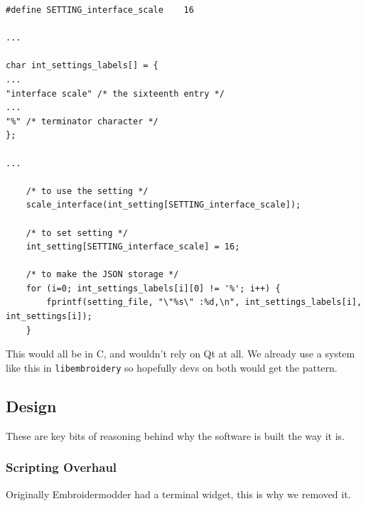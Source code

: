 \documentclass[a4paper, 11pt]{report}
\begin{document}
\begin{verbatim}
#define SETTING_interface_scale    16

...

char int_settings_labels[] = {
...
"interface scale" /* the sixteenth entry */
...
"%" /* terminator character */
};

...

    /* to use the setting */
    scale_interface(int_setting[SETTING_interface_scale]);

    /* to set setting */
    int_setting[SETTING_interface_scale] = 16;

    /* to make the JSON storage */
    for (i=0; int_settings_labels[i][0] != '%'; i++) {
        fprintf(setting_file, "\"%s\" :%d,\n", int_settings_labels[i], int_settings[i]);
    }
\end{verbatim}

This would all be in C, and wouldn't rely on Qt at all. We already use a
system like this in \texttt{libembroidery} so hopefully devs on both
would get the pattern.

\hypertarget{design-1}{%
\subsection{Design}\label{design-1}}

These are key bits of reasoning behind why the software is built the way
it is.

\hypertarget{scripting-overhaul-1}{%
\subsubsection{Scripting Overhaul}\label{scripting-overhaul-1}}

Originally Embroidermodder had a terminal widget, this is why we removed
it.
\end{document}
